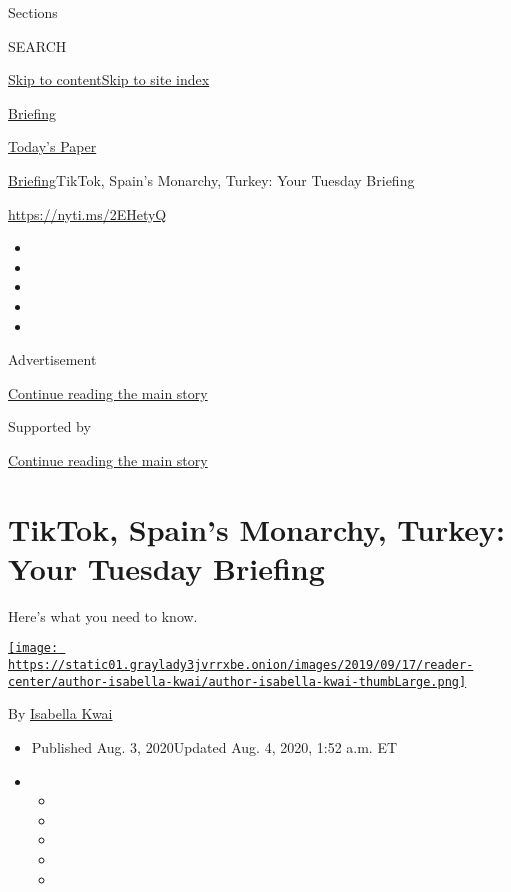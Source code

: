 Sections

SEARCH

\protect\hyperlink{site-content}{Skip to
content}\protect\hyperlink{site-index}{Skip to site index}

\href{https://www.nytimes3xbfgragh.onion/interactive/2018/briefing/global-morning-briefing-newsletter-signup.html}{Briefing}

\href{https://myaccount.nytimes3xbfgragh.onion/auth/login?response_type=cookie\&client_id=vi}{}

\href{https://www.nytimes3xbfgragh.onion/section/todayspaper}{Today's
Paper}

\href{/interactive/2018/briefing/global-morning-briefing-newsletter-signup.html}{Briefing}\textbar{}TikTok,
Spain's Monarchy, Turkey: Your Tuesday Briefing

\url{https://nyti.ms/2EHetyQ}

\begin{itemize}
\item
\item
\item
\item
\item
\end{itemize}

Advertisement

\protect\hyperlink{after-top}{Continue reading the main story}

Supported by

\protect\hyperlink{after-sponsor}{Continue reading the main story}

\hypertarget{tiktok-spains-monarchy-turkey-your-tuesday-briefing}{%
\section{TikTok, Spain's Monarchy, Turkey: Your Tuesday
Briefing}\label{tiktok-spains-monarchy-turkey-your-tuesday-briefing}}

Here's what you need to know.

\href{https://www.nytimes3xbfgragh.onion/by/isabella-kwai}{\texttt{[image: https://static01.graylady3jvrrxbe.onion/images/2019/09/17/reader-center/author-isabella-kwai/author-isabella-kwai-thumbLarge.png]}}

By \href{https://www.nytimes3xbfgragh.onion/by/isabella-kwai}{Isabella
Kwai}

\begin{itemize}
\item
  Published Aug. 3, 2020Updated Aug. 4, 2020, 1:52 a.m. ET
\item
  \begin{itemize}
  \item
  \item
  \item
  \item
  \item
  \end{itemize}
\end{itemize}

